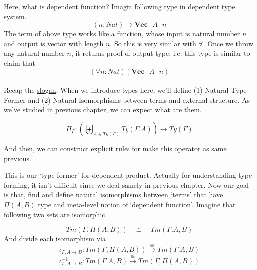 \documentclass[12pt, a4paper, openany, twoside]{book}
\theoremstyle{definition}
\theoremstyle{remark}
\theoremstyle{plain}
\numberwithin{equation}{section}
\begin{document}
Here, what is dependent function? Imagin following type in dependent type system. 
\[(n : Nat) \longrightarrow \textbf{Vec}\text{ }A \text{ }n\]
The term of above type works like a function, whose input is natural number $n$ and output is 
vector with length $n$. So this is very similar with $\forall$. Once we throw any natural number $n$, it returns 
proof of output type. i.e. this type is similar to claim that
\[(\forall n : Nat)(\textbf{Vec}\text{ }A\text{ }n)\]
\\
Recap the \hyperlink{slogan}{slogan}. When we introduce types here, we'll define (1) Natural Type Former and (2) Natural Isomorphisms between terms and external structure. 
As we've studied in previous chapter, we can expect what are them. 

\begin{tcolorbox}[colback=yellow!10!white,colframe=green!75!black,title=Construction 2.3.1. Natural Type Formal]
\[\Pi_{\Gamma} : \left(\biguplus_{A \in Ty(\Gamma)} Ty(\Gamma.A)\right) \rightarrow Ty(\Gamma)\]
\end{tcolorbox}
And then, we can construct explicit rules for make this operator as same previous. 
\begin{tcolorbox}[colback=yellow!10!white,colframe=green!75!black,title=Construction 2.3.2.]


\end{tcolorbox}

This is our \lq type former' for dependent product. Actually for understanding type forming, 
it isn't difficult since we deal samely in previous chapter. Now our goal is that, find and define 
natural isomorphisms between \lq terms' that have $\Pi(A, B)$ type and meta-level notion of \lq dependent function'. 
Imagine that following two sets are isomorphic. 

\begin{tcolorbox}[colback=yellow!10!white,colframe=green!75!black,title=Construction 2.3.3. Natural Isomorphism of Terms]

\[Tm(\Gamma, \Pi(A, B)) \quad \cong \quad Tm(\Gamma.A, B)\]
And divide each isomorphism via 
\[\iota_{\Gamma, A \rightarrow B} : Tm(\Gamma, \Pi(A, B)) \xrightarrow{\cong} Tm(\Gamma.A, B)\]
\[\iota_{\Gamma, A \rightarrow B}^{-1} : Tm(\Gamma.A, B) \xrightarrow{\cong} Tm(\Gamma, \Pi(A, B))\]

\end{tcolorbox}
\end{document}
